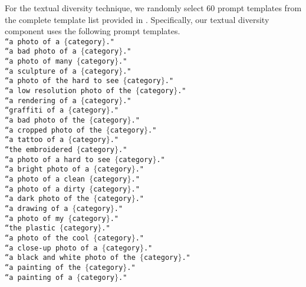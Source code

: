 \documentclass[10pt,twocolumn,letterpaper]{article}
\begin{document}
For the textual diversity technique, we randomly select 60 prompt templates from the complete template list provided in \cite{radford2021learning}. Specifically, our textual diversity component uses the following prompt templates. \\  {
    \texttt{``a photo of a $\{$category$\}$."}\\
    \texttt{``a bad photo of a $\{$category$\}$."}\\
    \texttt{``a photo of many $\{$category$\}$."}\\
    \texttt{``a sculpture of a $\{$category$\}$."}\\
    \texttt{``a photo of the hard to see $\{$category$\}$."}\\
    \texttt{``a low resolution photo of the $\{$category$\}$."}\\
    \texttt{``a rendering of a $\{$category$\}$."}\\
    \texttt{``graffiti of a $\{$category$\}$."}\\
    \texttt{``a bad photo of the $\{$category$\}$."}\\
    \texttt{``a cropped photo of the $\{$category$\}$."}\\
    \texttt{``a tattoo of a $\{$category$\}$."}\\
    \texttt{``the embroidered $\{$category$\}$."}\\
    \texttt{``a photo of a hard to see $\{$category$\}$."}\\
    \texttt{``a bright photo of a $\{$category$\}$."}\\
    \texttt{``a photo of a clean $\{$category$\}$."}\\
    \texttt{``a photo of a dirty $\{$category$\}$."}\\
    \texttt{``a dark photo of the $\{$category$\}$."}\\
    \texttt{``a drawing of a $\{$category$\}$."}\\
    \texttt{``a photo of my $\{$category$\}$."}\\
    \texttt{``the plastic $\{$category$\}$."}\\
    \texttt{``a photo of the cool $\{$category$\}$."}\\
    \texttt{``a close-up photo of a $\{$category$\}$."}\\
    \texttt{``a black and white photo of the $\{$category$\}$."}\\
    \texttt{``a painting of the $\{$category$\}$."}\\
    \texttt{``a painting of a $\{$category$\}$."}\\
}
\end{document}
